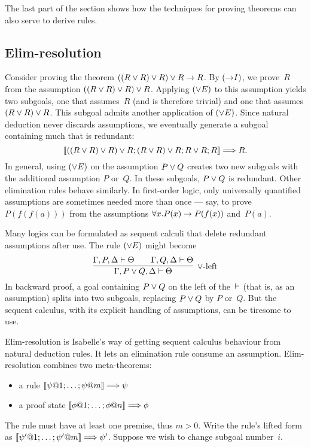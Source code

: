 The last part of the section shows how the techniques for proving theorems
can also serve to derive rules.

\subsection{Elim-resolution}

Consider proving the theorem $((R\vee R)\vee R)\vee R\rightarrow R$. By
$({\rightarrow}I)$, we prove~$R$ from the assumption $((R\vee R)\vee R)\vee R$.
Applying $(\vee E)$ to this assumption yields two subgoals, one that
assumes~$R$ (and is therefore trivial) and one that assumes $(R\vee
R)\vee R$. This subgoal admits another application of $(\vee E)$. Since
natural deduction never discards assumptions, we eventually generate a
subgoal containing much that is redundant:
\[ \mathopen{[\![}((R\vee R)\vee R)\vee R; (R\vee R)\vee R; R\vee R; R\mathclose{]\!]} \Longrightarrow R. \]
In general, using $(\vee E)$ on the assumption $P\vee Q$ creates two new
subgoals with the additional assumption $P$ or~$Q$. In these subgoals,
$P\vee Q$ is redundant. Other elimination rules behave
similarly. In first-order logic, only universally quantified
assumptions are sometimes needed more than once --- say, to prove
$P(f(f(a)))$ from the assumptions $\forall x.P(x)\rightarrow P(f(x))$ and~$P(a)$.

Many logics can be formulated as sequent calculi that delete redundant
assumptions after use. The rule $(\vee E)$ might become
\[ \infer[\disj\hbox{-left}]
{\Gamma,P\disj Q,\Delta \turn \Theta}
{\Gamma,P,\Delta \turn \Theta && \Gamma,Q,\Delta \turn \Theta}  \]
In backward proof, a goal containing $P\vee Q$ on the left of the~$\vdash$
(that is, as an assumption) splits into two subgoals, replacing $P\vee Q$
by $P$ or~$Q$. But the sequent calculus, with its explicit handling of
assumptions, can be tiresome to use.

Elim-resolution is Isabelle's way of getting sequent calculus behaviour
from natural deduction rules. It lets an elimination rule consume an
assumption. Elim-resolution combines two meta-theorems:
\begin{itemize}
    \item a rule $\List{\psi@1; \ldots; \psi@m} \Imp \psi$
    \item a proof state $\List{\phi@1; \ldots; \phi@n} \Imp \phi$
\end{itemize}
The rule must have at least one premise, thus $m>0$. Write the rule's
lifted form as $\mathopen{[\![}\psi'@1; \ldots; \psi'@m\mathclose{]\!]} \Longrightarrow \psi'$. Suppose we
wish to change subgoal number~$i$.

